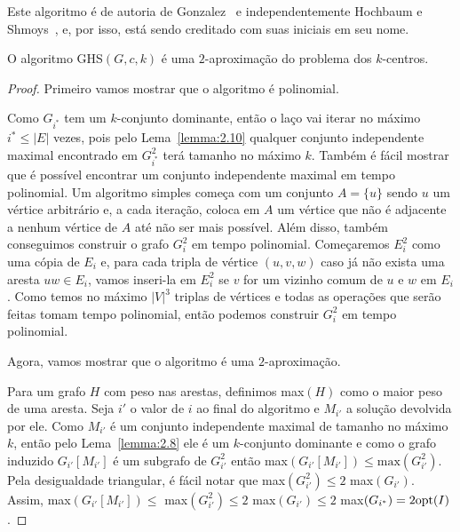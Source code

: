 Este algoritmo é de autoria de Gonzalez~\cite{GONZALEZ1985293} e independentemente Hochbaum e Shmoys~\cite{HSBottle}, e, por isso, está sendo creditado com suas iniciais em seu nome. 

\begin{theorem}
    O algoritmo {\sc GHS}$(G,c,k)$ é uma $2$-aproximação do problema dos $k$-centros.
\end{theorem}
\begin{proof}
    Primeiro vamos mostrar que o algoritmo é polinomial.
    
    Como $G_{i^*}$ tem um $k$-conjunto dominante, então o laço vai iterar no máximo $i^* \leq |E|$ vezes, pois pelo Lema~\ref{lemma:2.10} qualquer conjunto independente maximal encontrado em $G_{i^*}^2$ terá tamanho no máximo $k$.
    Também é fácil mostrar que é possível encontrar um conjunto independente maximal em tempo polinomial. Um algoritmo simples começa com um conjunto $A = \{u\}$ sendo $u$ um vértice arbitrário e, a cada iteração, coloca em $A$ um vértice que não é adjacente a nenhum vértice de $A$ até não ser mais possível.
    Além disso, também conseguimos construir o grafo $G_i^2$ em tempo polinomial. Começaremos $E_i^2$ como uma cópia de $E_i$ e, para cada tripla de vértice $(u,v,w)$ caso já não exista uma aresta $uw \in E_i$, vamos inseri-la em $E_i^2$ se $v$ for um vizinho comum de $u$ e $w$ em $E_i$. Como temos no máximo $|V|^3$ triplas de vértices e todas as operações que serão feitas tomam tempo polinomial, então podemos construir $G_i^2$ em tempo polinomial.

    Agora, vamos mostrar que o algoritmo é uma $2$-aproximação.

    Para um grafo $H$ com peso nas arestas, definimos max$(H)$ como o maior peso de uma aresta. Seja $i'$ o valor de $i$ ao final do algoritmo e $M_{i'}$ a solução devolvida por ele. Como $M_{i'}$ é um conjunto independente maximal de tamanho no máximo $k$, então pelo Lema~\ref{lemma:2.8} ele é um $k$-conjunto dominante e como o grafo induzido $G_{i'}[M_{i'}]$ é um subgrafo de $G_{i'}^2$ então max$(G_{i'}[M_{i'}]) \leq \text{max}(G_{i'}^2) $. Pela desigualdade triangular, é fácil notar que max$(G_{i'}^2) \leq 2$  max$(G_{i'})$. Assim, max$(G_{i'}[M_{i'}]) \leq $ max$(G_{i'}^2) \leq 2$ max$(G_{i'}) \leq 2$ max$(G_{i^*})= 2 \mathrm{opt}(I)$. 
\end{proof}

